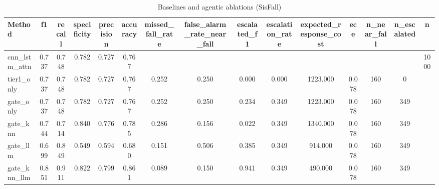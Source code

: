 \begin{table}[t]
\centering
\caption{Baselines and agentic ablations (SisFall)}
\begin{tabular}{lcccccccccccccc}
\toprule
Method & f1 & recall & specificity & precision & accuracy & missed_fall_rate & false_alarm_rate_near_fall & escalated_f1 & escalation_rate & expected_response_cost & ece & n_near_fall & n_escalated & n \\
\midrule
cnn_lstm_attn & 0.737 & 0.748 & 0.782 & 0.727 & 0.767 &  &  &  &  &  &  &  &  & 1000 \\
tier1_only & 0.737 & 0.748 & 0.782 & 0.727 & 0.767 & 0.252 & 0.250 & 0.000 & 0.000 & 1223.000 & 0.078 & 160 & 0 &  \\
gate_only & 0.737 & 0.748 & 0.782 & 0.727 & 0.767 & 0.252 & 0.250 & 0.234 & 0.349 & 1223.000 & 0.078 & 160 & 349 &  \\
gate_knn & 0.744 & 0.714 & 0.840 & 0.776 & 0.785 & 0.286 & 0.156 & 0.022 & 0.349 & 1340.000 & 0.078 & 160 & 349 &  \\
gate_llm & 0.699 & 0.849 & 0.549 & 0.594 & 0.680 & 0.151 & 0.506 & 0.385 & 0.349 & 914.000 & 0.078 & 160 & 349 &  \\
gate_knn_llm & 0.851 & 0.911 & 0.822 & 0.799 & 0.861 & 0.089 & 0.150 & 0.941 & 0.349 & 490.000 & 0.078 & 160 & 349 &  \\
\bottomrule
\end{tabular}
\end{table}